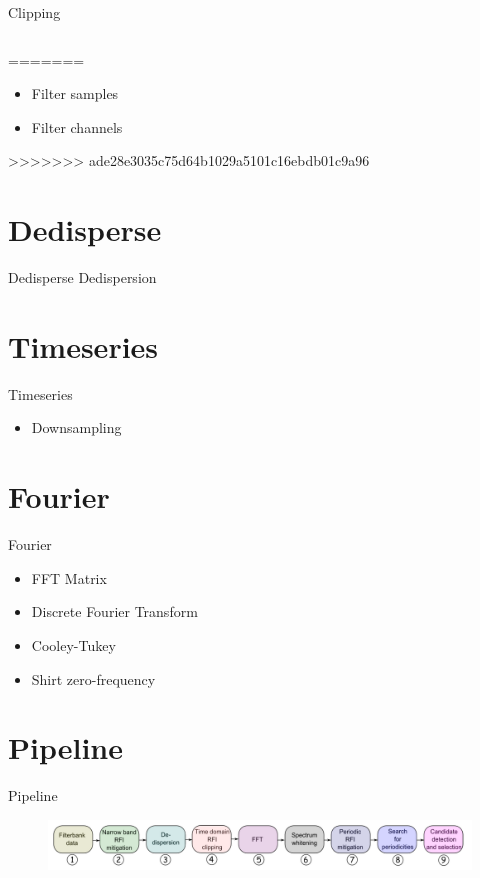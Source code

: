 \documentclass{beamer}
\begin{document}
\begin{frame}{Clipping}
\begin{columns}
\begin{column}{0.5\textwidth}
		\end{column}
	\end{columns}
=======
	\begin{itemize}
		\item Filter samples
		\item Filter channels
	\end{itemize}
>>>>>>> ade28e3035c75d64b1029a5101c16ebdb01c9a96
\end{frame}

\section{Dedisperse}
\begin{frame}{Dedisperse}
	Dedispersion
\end{frame}

\section{Timeseries}
\begin{frame}{Timeseries}
	\begin{itemize}
		\item Downsampling
	\end{itemize}
\end{frame}

\section{Fourier}
\begin{frame}{Fourier}
	\begin{itemize}
		\item FFT Matrix
		\item Discrete Fourier Transform
		\item Cooley-Tukey
		\item Shirt zero-frequency
	\end{itemize}
\end{frame}

\section{Pipeline}
\begin{frame}{Pipeline}
	\begin{figure}
		\includegraphics[width=\textwidth]{pipeline-order}
	\end{figure}
\end{frame}
\end{document}
